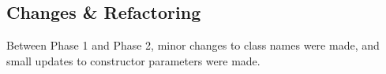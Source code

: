 \documentclass[12pt]{scrartcl} %
\begin{document}






\subsection{Changes \& Refactoring}

Between Phase 1 and Phase 2, minor changes to class names were made, and small updates to constructor parameters were made.



\nocite{*}

%

\end{document}
